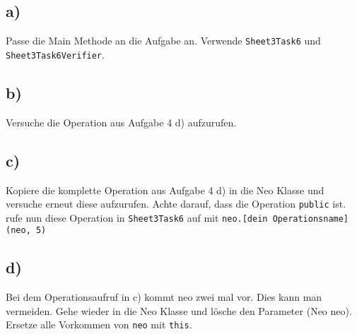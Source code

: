 \subsection*{a)}
	Passe die Main Methode an die Aufgabe an. Verwende \lstinline{Sheet3Task6} und \lstinline{Sheet3Task6Verifier}.
\subsection*{b)}
	Versuche die Operation aus Aufgabe 4 d) aufzurufen.
\subsection*{c)}
	Kopiere die komplette Operation aus Aufgabe 4 d) in die Neo Klasse und versuche erneut diese aufzurufen. Achte darauf, dass die Operation \lstinline{public} ist.
	rufe nun diese Operation in \lstinline{Sheet3Task6} auf mit \lstinline{neo.[dein Operationsname](neo, 5)}
\subsection*{d)} Bei dem Operationsaufruf in c) kommt neo zwei mal vor. Dies kann man vermeiden. Gehe wieder in die Neo Klasse und lösche den Parameter (Neo neo). Ersetze alle Vorkommen von \lstinline{neo} mit \lstinline{this}.
